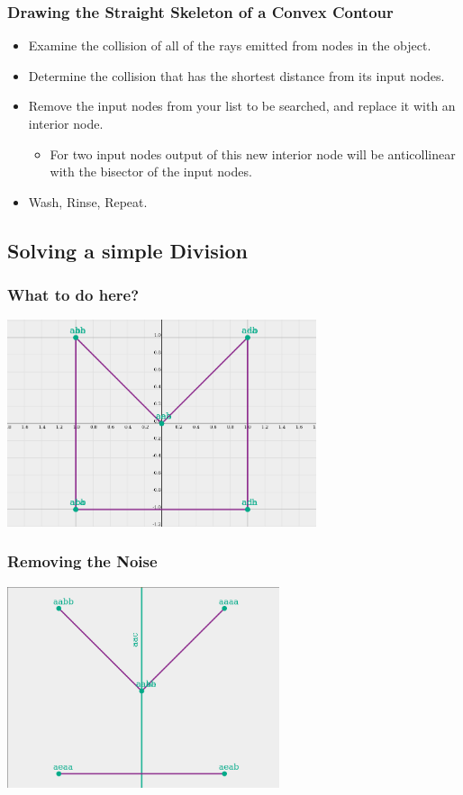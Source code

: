 \documentclass[hyperref={pdfpagemode=FullScreen},aspectratio=169]{beamer}
\begin{document}
\begin{frame}
  \frametitle{Drawing the Straight Skeleton of a Convex Contour}
  \begin{itemize}
  \item Examine the collision of all of the rays emitted from nodes in the object.
  \item Determine the collision that has the shortest distance from its input nodes.
  \item Remove the input nodes from your list to be searched, and replace it with an interior node.
    \begin{itemize}
    \item For two input nodes output of this new interior node will be anticollinear with the bisector of the input nodes.
    \end{itemize}
  \item Wash, Rinse, Repeat.
  \end{itemize}
\end{frame}

\subsection {Solving a simple Division}

\begin{frame}
  \frametitle{What to do here?}
  \includegraphics[width=0.68\textwidth, center]{C3.png}
\end{frame}

\begin{frame}
  \frametitle{Removing the Noise}
  \includegraphics[width=0.6\textwidth, center]{C3-motorcycle-nogrid.png}
\end{frame}
\end{document}
